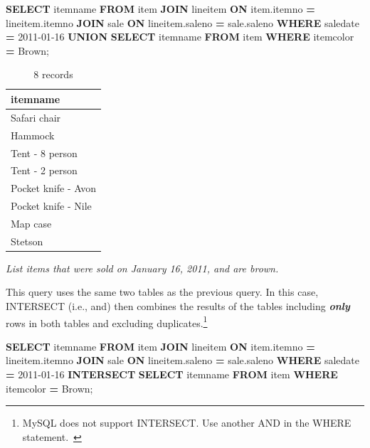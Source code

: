 \documentclass[
]{article}
\newenvironment{Shaded}{\begin{snugshade}}{\end{snugshade}}
\newcommand{\KeywordTok}[1]{\textcolor[rgb]{0.13,0.29,0.53}{\textbf{#1}}}
\newcommand{\NormalTok}[1]{#1}
\newcommand{\OperatorTok}[1]{\textcolor[rgb]{0.81,0.36,0.00}{\textbf{#1}}}
\newcommand{\StringTok}[1]{\textcolor[rgb]{0.31,0.60,0.02}{#1}}
\begin{document}
\begin{Shaded}
\begin{Highlighting}[]
\KeywordTok{SELECT}\NormalTok{ itemname }\KeywordTok{FROM}\NormalTok{ item }\KeywordTok{JOIN}\NormalTok{ lineitem}
    \KeywordTok{ON}\NormalTok{ item.itemno }\OperatorTok{=}\NormalTok{ lineitem.itemno}
    \KeywordTok{JOIN}\NormalTok{ sale}
    \KeywordTok{ON}\NormalTok{ lineitem.saleno }\OperatorTok{=}\NormalTok{ sale.saleno}
    \KeywordTok{WHERE}\NormalTok{ saledate }\OperatorTok{=} \StringTok{\textquotesingle{}2011{-}01{-}16\textquotesingle{}}
\KeywordTok{UNION}
    \KeywordTok{SELECT}\NormalTok{ itemname }\KeywordTok{FROM}\NormalTok{ item }\KeywordTok{WHERE}\NormalTok{ itemcolor }\OperatorTok{=} \StringTok{\textquotesingle{}Brown\textquotesingle{}}\NormalTok{;}
\end{Highlighting}
\end{Shaded}

\begin{table}

\caption{\label{tab:unnamed-chunk-71}8 records}
\centering
\begin{tabular}[t]{l}
\hline
itemname\\
\hline
Safari chair\\
\hline
Hammock\\
\hline
Tent - 8 person\\
\hline
Tent - 2 person\\
\hline
Pocket knife - Avon\\
\hline
Pocket knife - Nile\\
\hline
Map case\\
\hline
Stetson\\
\hline
\end{tabular}
\end{table}

\emph{List items that were sold on January 16, 2011, and are brown.}

This query uses the same two tables as the previous query. In this case, INTERSECT (i.e., and) then combines the results of the tables including \textbf{\emph{only}} rows in both tables and excluding duplicates.\footnote{MySQL does not support INTERSECT. Use another AND in the WHERE statement.~}

\begin{Shaded}
\begin{Highlighting}[]
\KeywordTok{SELECT}\NormalTok{ itemname }\KeywordTok{FROM}\NormalTok{ item }\KeywordTok{JOIN}\NormalTok{ lineitem}
    \KeywordTok{ON}\NormalTok{ item.itemno }\OperatorTok{=}\NormalTok{ lineitem.itemno}
    \KeywordTok{JOIN}\NormalTok{ sale}
    \KeywordTok{ON}\NormalTok{ lineitem.saleno }\OperatorTok{=}\NormalTok{ sale.saleno}
    \KeywordTok{WHERE}\NormalTok{ saledate }\OperatorTok{=} \StringTok{\textquotesingle{}2011{-}01{-}16\textquotesingle{}}
\KeywordTok{INTERSECT}
    \KeywordTok{SELECT}\NormalTok{ itemname }\KeywordTok{FROM}\NormalTok{ item }\KeywordTok{WHERE}\NormalTok{ itemcolor }\OperatorTok{=} \StringTok{\textquotesingle{}Brown\textquotesingle{}}\NormalTok{;}
\end{Highlighting}
\end{Shaded}
\end{document}
